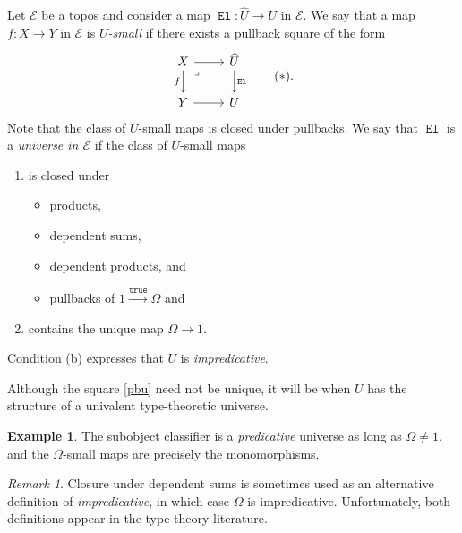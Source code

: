 \documentclass[10pt,letterpaper,cm]{nupset}
\theoremstyle{definition}
\newtheorem{exmp}[definition]{Example}
\theoremstyle{theorem}
\theoremstyle{remark}
\newtheorem{remark}[definition]{Remark}
\newcommand{\1}{\mathbf{1}}
\newcommand{\e}{\mathscr{E}}
\newcommand{\0}{\vec 0}
\DeclareMathOperator{\true}{\mathtt{true}}
\DeclareMathOperator{\el}{\mathtt{El}}
\newcommand{\bi}{\begin{itemize}}
\newcommand{\ei}{\end{itemize}}
\newcommand{\be}{\begin{enumerate}}
\newcommand{\ee}{\end{enumerate}}
\begin{document}
Let $\e$ be a topos and consider a map $\el : \widehat{U} \to U$ in $\e$. We say that a map $f: X \to Y$ in $\e$ is \textit{$U$-small} if there exists a pullback square  of the form  
\[ \label{pbu}
\begin{tikzcd}[ampersand replacement=\&]
	X \& {\widehat{U}} \\
	Y \& U
	\arrow["\el", from=1-2, to=2-2]
	\arrow[from=2-1, to=2-2]
	\arrow["f"', from=1-1, to=2-1]
	\arrow[from=1-1, to=1-2]
	\arrow["\lrcorner"{anchor=center, pos=0.125}, draw=none, from=1-1, to=2-2]
\end{tikzcd} \tag{$\ast$}
.\] Note that the class of $U$-small maps is closed under pullbacks.
We say that $\el$ is a \textit{universe  in $\e$} if the class of $U$-small maps 
\be[label=(\alph*)]
\item is closed under  
\bi
\item products,  
\item dependent sums,
\item dependent products, and 
\item pullbacks of $1 \xrightarrow{\true} \Omega$ and
\ei
\item contains the unique map $\Omega \to 1$.
\ee 
Condition (b) expresses that $U$ is \textit{impredicative}.

\medskip

Although the square \eqref{pbu} need not be unique, it will be when $U$ has the structure of a univalent type-theoretic universe.

\begin{exmp}
The subobject classifier is a \emph{predicative} universe as long as $\Omega \ne 1$, and the $\Omega$-small maps are precisely the monomorphisms.
\end{exmp}

\begin{remark}
Closure under dependent sums is sometimes used as an alternative definition of \textit{impredicative}, in which case $\Omega$ is impredicative. Unfortunately, both definitions appear in the type theory literature.
\end{remark}
\end{document}
